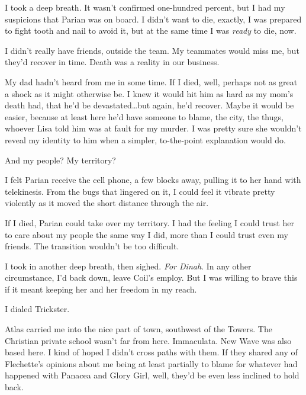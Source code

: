 I took a deep breath.  It wasn't confirmed one-hundred percent, but I had my suspicions that Parian was on board.  I didn't want to die, exactly, I was prepared to fight tooth and nail to avoid it, but at the same time I was \emph{ready }to die, now.



I didn't really have friends, outside the team.  My teammates would miss me, but they'd recover in time.  Death was a reality in our business.



My dad hadn't heard from me in some time.  If I died, well, perhaps not as great a shock as it might otherwise be.  I knew it would hit him as hard as my mom's death had, that he'd be devastated\ldots but again, he'd recover.  Maybe it would be easier, because at least here he'd have someone to blame, the city, the thugs, whoever Lisa told him was at fault for my murder.  I was pretty sure she wouldn't reveal my identity to him when a simpler, to-the-point explanation would do.



And my people?  My territory?



I felt Parian receive the cell phone, a few blocks away, pulling it to her hand with telekinesis.  From the bugs that lingered on it, I could feel it vibrate pretty violently as it moved the short distance through the air.



If I died, Parian could take over my territory.  I had the feeling I could trust her to care about my people the same way I did, more than I could trust even my friends.  The transition wouldn't be too difficult.



I took in another deep breath, then sighed.  \emph{For Dinah}.  In any other circumstance, I'd back down, leave Coil's employ.  But I was willing to brave this if it meant keeping her and her freedom in my reach.



I dialed Trickster.



\sectionbreak



Atlas carried me into the nice part of town, southwest of the Towers.  The Christian private school wasn't far from here.  Immaculata.  New Wave was also based here.  I kind of hoped I didn't cross paths with them.  If they shared any of Flechette's opinions about me being at least partially to blame for whatever had happened with Panacea and Glory Girl, well, they'd be even less inclined to hold back.




